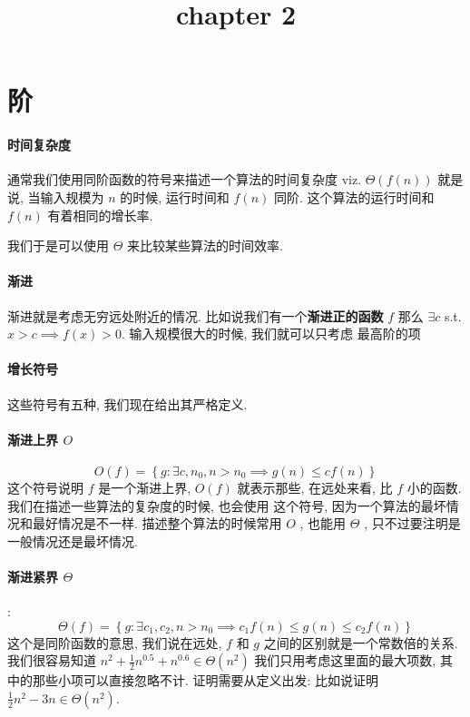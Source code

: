 \documentclass[a4paper, 10pt]{ctexart} %
\title{chapter 2}
\begin{document}
\maketitle
\tableofcontents
\section{阶}
\paragraph*{时间复杂度} 通常我们使用同阶函数的符号来描述一个算法的时间复杂度 viz. $\varTheta \left( f(n)\right)$  就是说, 当输入规模为 $n$ 的时候, 
运行时间和 $ f\left(n\right)$ 同阶. 这个算法的运行时间和 $f\left(n\right)$ 有着相同的增长率. 

我们于是可以使用 $\varTheta$ 来比较某些算法的时间效率. 

\paragraph*{渐进} 渐进就是考虑无穷远处附近的情况. 比如说我们有一个{\bfseries 渐进正的函数} $f$
那么 $\exists c$ s.t. $x > c \implies f(x) > 0$. 输入规模很大的时候, 我们就可以只考虑
最高阶的项

\paragraph*{增长符号} 这些符号有五种, 我们现在给出其严格定义.

\paragraph*{渐进上界 $O$}  
\[
O \left(f \right) = \left\{ g : \exists c , n_{0}, n > n_{0} \implies g  \left(n\right) \le c f\left(n\right) \right\}
\]
这个符号说明 $f$ 是一个渐进上界, $O\left(f\right)$ 就表示那些, 在远处来看, 比 $f$ 小的函数. 我们在描述一些算法的复杂度的时候, 也会使用
这个符号, 因为一个算法的最坏情况和最好情况是不一样. 描述整个算法的时候常用 $O$ , 也能用 $\Theta$ , 只不过要注明是一般情况还是最坏情况.


\paragraph*{渐进紧界 $\varTheta$} :
\[
\varTheta \left(f\right) = \left\{g: \exists c_{1} , c_2, n > n_{0} \implies  c_{1} f\left(n\right) \le g\left(n\right) \le c_{2} f\left(n\right)\right\}
\]
这个是同阶函数的意思, 我们说在远处, $f$ 和 $g$ 之间的区别就是一个常数倍的关系. 我们很容易知道 
$\displaystyle  n^{2} + \frac{1}{2} n^{0.5} +  n^{0.6} \in \Theta \left(n^{2}\right)$ 
我们只用考虑这里面的最大项数, 其中的那些小项可以直接忽略不计. 证明需要从定义出发:
比如说证明 $\displaystyle \frac{1}{2} n^{2} - 3n \in \Theta \left(n^{2}\right)$. 
\end{document}
